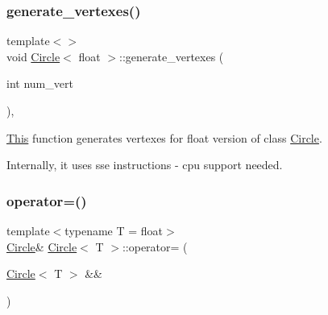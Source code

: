 \mbox{\label{classCircle_a5c5d9e9bf7ddada0681ad6977e4469f6}} 
\subsubsection{\texorpdfstring{generate\+\_\+vertexes()}{generate\_vertexes()}\hspace{0.1cm}{\footnotesize\ttfamily [2/2]}}
{\footnotesize\ttfamily template$<$$>$ \\
void \mbox{\hyperlink{classCircle}{Circle}}$<$ float $>$\+::generate\+\_\+vertexes (\begin{DoxyParamCaption}\item[{int}]{num\+\_\+vert }\end{DoxyParamCaption})\hspace{0.3cm}{\ttfamily [inline]}, {\ttfamily [private]}}



\mbox{\hyperlink{classThis}{This}} function generates vertexes for float version of class \mbox{\hyperlink{classCircle}{Circle}}. 

Internally, it uses sse instructions -\/ cpu support needed. \mbox{\label{classCircle_a06c8a2624fa51b38023e0326e8ccf789}} 
\subsubsection{\texorpdfstring{operator=()}{operator=()}\hspace{0.1cm}{\footnotesize\ttfamily [1/2]}}
{\footnotesize\ttfamily template$<$typename T  = float$>$ \\
\mbox{\hyperlink{classCircle}{Circle}}\& \mbox{\hyperlink{classCircle}{Circle}}$<$ T $>$\+::operator= (\begin{DoxyParamCaption}\item[{\mbox{\hyperlink{classCircle}{Circle}}$<$ T $>$ \&\&}]{ }\end{DoxyParamCaption})\hspace{0.3cm}{\ttfamily [default]}}

\mbox{\label{classCircle_a0e3ef62951a8fccaf0635ea21ae73eca}} 
